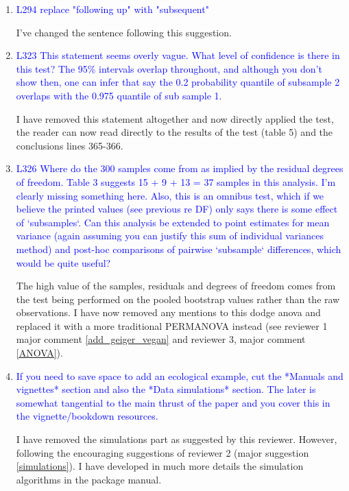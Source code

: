 \documentclass[12pt,letterpaper]{article}
\begin{document}
\begin{enumerate}
\item{\textcolor{blue}{L294 replace "following up" with "subsequent"}}

I've changed the sentence following this suggestion.

\item{\textcolor{blue}{L323 This statement seems overly vague. What level of confidence is there in this test? The 95\% intervals overlap throughout, and although you don't show then, one can infer that say the 0.2 probability quantile of subsample 2 overlaps with the 0.975 quantile of sub sample 1.}}

I have removed this statement altogether and now directly applied the test, the reader can now read directly to the results of the test (table 5) and the conclusions lines 365-366.

\item{\textcolor{blue}{L326 Where do the 300 samples come from as implied by the residual degrees of freedom. Table 3 suggests 15 + 9 + 13 = 37 samples in this analysis. I'm clearly missing something here. Also, this is an omnibus test, which if we believe the printed values (see previous re DF) only says there is some effect of `subsamples`. Can this analysis be extended to point estimates for mean variance (again assuming you can justify this sum of individual variances method) and post-hoc comparisons of pairwise `subsample` differences, which would be quite useful?}}

The high value of the samples, residuals and degrees of freedom comes from the test being performed on the pooled bootstrap values rather than the raw observations.
I have now removed any mentions to this dodge anova and replaced it with a more traditional PERMANOVA instead (see reviewer 1 major comment \ref{add_geiger_vegan} and reviewer 3, major comment \ref{ANOVA}).


\item{\textcolor{blue}{If you need to save space to add an ecological example, cut the *Manuals and vignettes* section and also the *Data simulations* section. The later is somewhat tangential to the main thrust of the paper and you cover this in the vignette/bookdown resources.}}
\label{remove_simulations}

I have removed the simulations part as suggested by this reviewer.
However, following the encouraging suggestions of reviewer 2 (major suggestion \ref{simulations}).
I have developed in much more details the simulation algorithms in the package manual.

\end{enumerate}
\end{document}
